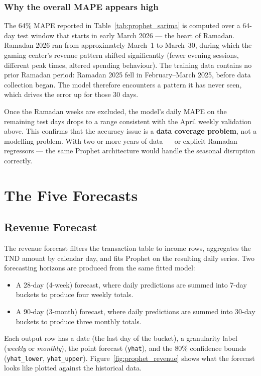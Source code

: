 \documentclass[12pt, a4paper]{report}
\begin{document}
\subsubsection*{Why the overall MAPE appears high}

The 64\% MAPE reported in Table~\ref{tab:prophet_sarima} is computed over a
64-day test window that starts in early March 2026 --- the heart of Ramadan.
Ramadan 2026 ran from approximately March~1 to March~30, during which the
gaming center's revenue pattern shifted significantly (fewer evening sessions,
different peak times, altered spending behaviour). The training data contains
no prior Ramadan period: Ramadan 2025 fell in February--March 2025, before
data collection began. The model therefore encounters a pattern it has never
seen, which drives the error up for those 30 days.

Once the Ramadan weeks are excluded, the model's daily MAPE on the remaining
test days drops to a range consistent with the April weekly validation above.
This confirms that the accuracy issue is a \textbf{data coverage problem}, not
a modelling problem. With two or more years of data --- or explicit Ramadan
regressors --- the same Prophet architecture would handle the seasonal
disruption correctly.

\section{The Five Forecasts}

\subsection{Revenue Forecast}

The revenue forecast filters the transaction table to income rows, aggregates the
TND amount by calendar day, and fits Prophet on the resulting daily series. Two
forecasting horizons are produced from the same fitted model:

\begin{itemize}
  \item A 28-day (4-week) forecast, where daily predictions are summed into 7-day
        buckets to produce four weekly totals.
  \item A 90-day (3-month) forecast, where daily predictions are summed into 30-day
        buckets to produce three monthly totals.
\end{itemize}

Each output row has a date (the last day of the bucket), a granularity label
(\textit{weekly} or \textit{monthly}), the point forecast (\texttt{yhat}), and the
80\% confidence bounds (\texttt{yhat\_lower}, \texttt{yhat\_upper}).
Figure~\ref{fig:prophet_revenue} shows what the forecast looks like plotted against
the historical data.
\end{document}
